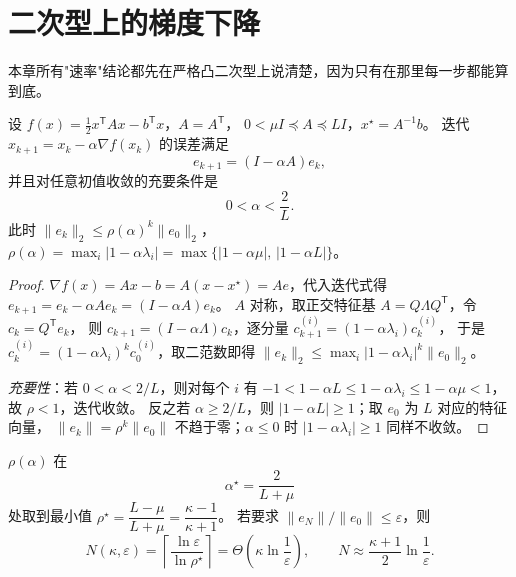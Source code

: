 \section{二次型上的梯度下降}

本章所有"速率"结论都先在严格凸二次型上说清楚，因为只有在那里每一步都能算到底。

\begin{theorem}[定步长梯度下降的误差递推与收敛充要条件]
\label{thm:gd-recurrence}
设 $f(x)=\tfrac12x^{\mathsf T}Ax-b^{\mathsf T}x$，$A=A^{\mathsf T}$，
$0<\mu I\preceq A\preceq LI$，$x^\star=A^{-1}b$。
迭代 $x_{k+1}=x_k-\alpha\nabla f(x_k)$ 的误差满足
\[
  e_{k+1}=(I-\alpha A)e_k ,
\]
并且对任意初值收敛的充要条件是
\[
  0<\alpha<\frac{2}{L}.
\]
此时 $\|e_k\|_2\le\rho(\alpha)^k\|e_0\|_2$，
$\rho(\alpha)=\max_i|1-\alpha\lambda_i|=\max\{|1-\alpha\mu|,\,|1-\alpha L|\}$。
\end{theorem}

\begin{proof}
$\nabla f(x)=Ax-b=A(x-x^\star)=Ae$，代入迭代式得
$e_{k+1}=e_k-\alpha Ae_k=(I-\alpha A)e_k$。
$A$ 对称，取正交特征基 $A=Q\Lambda Q^{\mathsf T}$，令 $c_k=Q^{\mathsf T}e_k$，
则 $c_{k+1}=(I-\alpha\Lambda)c_k$，逐分量 $c_{k+1}^{(i)}=(1-\alpha\lambda_i)c_k^{(i)}$，
于是 $c_k^{(i)}=(1-\alpha\lambda_i)^k c_0^{(i)}$，取二范数即得
$\|e_k\|_2\le\max_i|1-\alpha\lambda_i|^k\|e_0\|_2$。

\emph{充要性}：若 $0<\alpha<2/L$，则对每个 $i$ 有
$-1<1-\alpha L\le1-\alpha\lambda_i\le1-\alpha\mu<1$，故 $\rho<1$，迭代收敛。
反之若 $\alpha\ge2/L$，则 $|1-\alpha L|\ge1$；取 $e_0$ 为 $L$ 对应的特征向量，
$\|e_k\|=\rho^k\|e_0\|$ 不趋于零；$\alpha\le0$ 时 $|1-\alpha\lambda_i|\ge1$ 同样不收敛。
\end{proof}

\begin{corollary}[最优步长与依赖条件数的迭代数]
\label{cor:gd-rate}
$\rho(\alpha)$ 在
\[
  \alpha^\star=\frac{2}{L+\mu}
\]
处取到最小值 $\rho^\star=\dfrac{L-\mu}{L+\mu}=\dfrac{\kappa-1}{\kappa+1}$。
若要求 $\|e_N\|/\|e_0\|\le\varepsilon$，则
\[
  N(\kappa,\varepsilon)=\left\lceil\frac{\ln\varepsilon}{\ln\rho^\star}\right\rceil
  =\Theta\!\left(\kappa\ln\frac1\varepsilon\right),
  \qquad
  N\approx\frac{\kappa+1}{2}\ln\frac1\varepsilon .
\]
\end{corollary}

